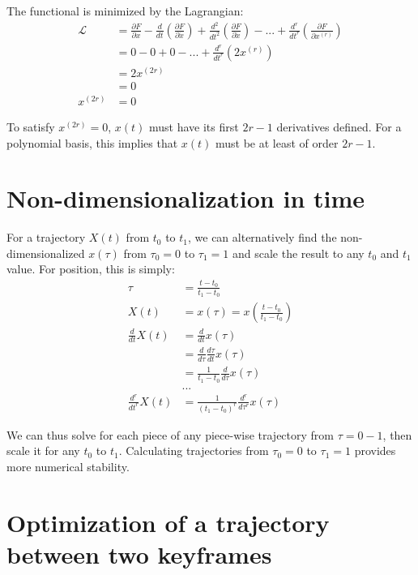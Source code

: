 \documentclass[11pt]{article}
\begin{document}
The functional is minimized by the Lagrangian:
\begin{align*}
\mathcal{L} &= \frac{ \partial F}{\partial x} - \frac{d}{dt} ( \frac{ \partial F}{\partial \dot{x} }  ) + \frac{d^2}{dt^2} ( \frac{ \partial F}{\partial \ddot{x} }  ) - ... + \frac{d^r}{dt^r} ( \frac{ \partial F}{\partial x^{(r)} }  ) \\
&= 0 - 0 + 0 - ... + \frac{d^r}{dt^r} (2 x^{(r)} ) \\
&= 2 x^{(2r)} \\
&= 0 \\
x^{(2r)} &= 0
\end{align*}

To satisfy $x^{(2r)} = 0$, $x(t)$ must have its first $2r-1$ derivatives defined. For a polynomial basis, this implies that $x(t)$ must be at least of order $2r-1$. 

\section{Non-dimensionalization in time}

For a trajectory $X(t)$ from $t_0$ to $t_1$, we can alternatively find the non-dimensionalized $x(\tau)$ from $\tau_0 = 0$ to $\tau_1 = 1$ and scale the result to any $t_0$ and $t_1$ value. For position, this is simply: 
\begin{align*}
\tau &= \frac{t-t_0}{t_1-t_0} \\
X(t) &= x(\tau) = x( \frac{t-t_0}{t_1-t_0}) \\
\frac{d}{dt} X(t) &= \frac{d}{dt} x(\tau) \\
& = \frac{d}{d \tau} \frac{d \tau}{dt} x(\tau) \\
&= \frac{1}{t_1-t_0} \frac{d}{d \tau} x(\tau) \\ 
& ... \\
\frac{d^r}{dt^r} X(t) &= \frac{1}{(t_1-t_0)^r} \frac{d^r}{d \tau^r} x(\tau)
\end{align*}

We can thus solve for each piece of any piece-wise trajectory from $\tau = 0-1$, then scale it for any $t_0$ to $t_1$. Calculating trajectories from $\tau_0 = 0$ to $\tau_1 = 1$ provides more numerical stability. 









\newpage
\section{Optimization of a trajectory between two keyframes} 
\end{document}
